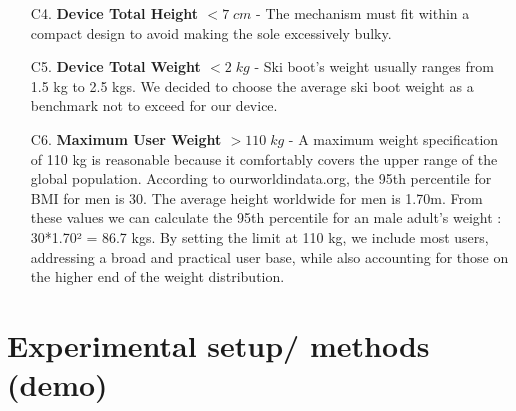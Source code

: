 \documentclass[lettersize,journal]{IEEEtran}
\begin{document}
\begin{enumerate}
    \item[C4.] \textbf{Device Total Height $<7\;cm$} - The mechanism must fit within a compact design to avoid making the sole excessively bulky.

    \item[C5.] \textbf{Device Total Weight $< 2\;kg$} - Ski boot's weight usually ranges from 1.5 kg to 2.5 kgs. We decided to choose the average ski boot weight as a benchmark not to exceed for our device.

    \item[C6.] \textbf{Maximum User Weight $> 110 \; kg$} - A maximum weight specification of 110 kg is reasonable because it comfortably covers the upper range of the global population. According to ourworldindata.org, the 95th percentile for BMI for men is 30. The average height worldwide for men is 1.70m. From these values we can calculate the 95th percentile for an male adult's weight : 
    30*1.70² = 86.7 kgs. By setting the limit at 110 kg, we include most users, addressing a broad and practical user base, while also accounting for those on the higher end of the weight distribution.
\end{enumerate}





\section{Experimental setup/ methods (demo)}
\end{document}

